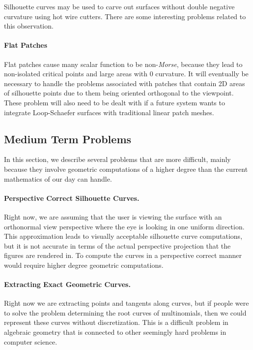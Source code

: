 \documentclass[12pt, letterpaper]{article}
\begin{document}
		Silhouette curves may be used to carve out surfaces without double negative curvature using hot wire cutters.
		There are some interesting problems related to this observation.

		\paragraph{Flat Patches}

		Flat patches cause many scalar function to be non-\emph{Morse}, because they lead to non-isolated critical points and large areas with 0 curvature.
		It will eventually be necessary to handle the problems associated with patches that contain 2D areas of silhouette points 
		due to them being oriented orthogonal to the viewpoint. These problem will also need to be dealt with if a future system wants to integrate
		Loop-Schaefer surfaces with traditional linear patch meshes.


	\subsection{Medium Term Problems}

		In this section, we describe several problems that are more difficult,
		mainly because they involve geometric computations of a higher degree than the current mathematics of our day can handle.
		
		\paragraph{Perspective Correct Silhouette Curves.}
		Right now, we are assuming that the user is viewing the surface with an orthonormal view perspective where the eye is looking in one uniform direction.
		This approximation leads to visually acceptable silhouette curve computations, but it is not accurate in terms of the actual perspective projection that the figures are rendered in.
		To compute the curves in a perspective correct manner would require higher degree geometric computations.

		\paragraph{Extracting Exact Geometric Curves.}
		Right now we are extracting points and tangents along curves, but if people were to solve the problem determining the root curves of multinomials, then we could represent these curves without discretization.
		This is a difficult problem in algebraic geometry that is connected to other seemingly hard problems in computer science.
\end{document}
